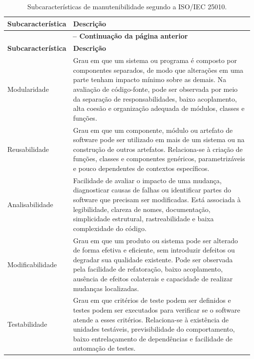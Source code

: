 \begin{longtable}{p{3.5cm}p{11.5cm}}
\caption{Subcaracterísticas de manutenibilidade segundo a ISO/IEC 25010.} \label{tab:subcaracteristicas_manutenibilidade} \\
\toprule
\textbf{Subcaracterística} & \textbf{Descrição} \\
\midrule
\endfirsthead
\multicolumn{2}{c}{{\bfseries \tablename\ \thetable{} -- Continuação da página anterior}} \\
\toprule
\textbf{Subcaracterística} & \textbf{Descrição} \\
\midrule
\endhead
\bottomrule
\endfoot
\bottomrule
\endlastfoot
Modularidade &
Grau em que um sistema ou programa é composto por componentes separados, de modo que alterações em uma parte tenham impacto mínimo sobre as demais. Na avaliação de código-fonte, pode ser observada por meio da separação de responsabilidades, baixo acoplamento, alta coesão e organização adequada de módulos, classes e funções. \\
\addlinespace
Reusabilidade &
Grau em que um componente, módulo ou artefato de software pode ser utilizado em mais de um sistema ou na construção de outros artefatos. Relaciona-se à criação de funções, classes e componentes genéricos, parametrizáveis e pouco dependentes de contextos específicos. \\
\addlinespace
Analisabilidade &
Facilidade de avaliar o impacto de uma mudança, diagnosticar causas de falhas ou identificar partes do software que precisam ser modificadas. Está associada à legibilidade, clareza de nomes, documentação, simplicidade estrutural, rastreabilidade e baixa complexidade do código. \\
\addlinespace
Modificabilidade &
Grau em que um produto ou sistema pode ser alterado de forma efetiva e eficiente, sem introduzir defeitos ou degradar sua qualidade existente. Pode ser observada pela facilidade de refatoração, baixo acoplamento, ausência de efeitos colaterais e capacidade de realizar mudanças localizadas. \\
\addlinespace
Testabilidade &
Grau em que critérios de teste podem ser definidos e testes podem ser executados para verificar se o software atende a esses critérios. Relaciona-se à existência de unidades testáveis, previsibilidade do comportamento, baixo entrelaçamento de dependências e facilidade de automação de testes. \\
\bottomrule
\end{longtable}

